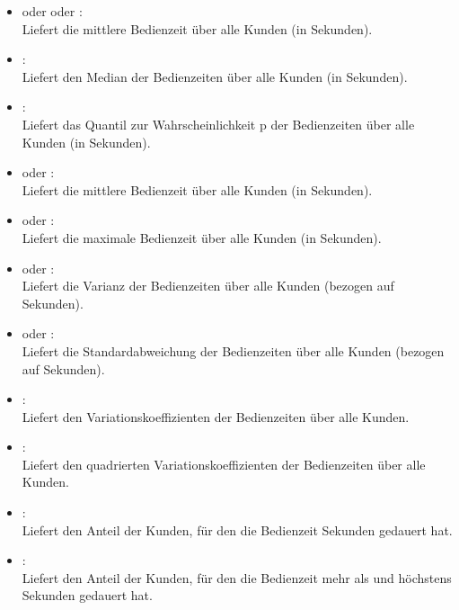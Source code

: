 \begin{itemize}

\item
{} oder  oder :\\
Liefert die mittlere Bedienzeit über alle Kunden (in Sekunden).

\item
{}:\\
Liefert den Median der Bedienzeiten über alle Kunden (in Sekunden).

\item
{}:\\
Liefert das Quantil zur Wahrscheinlichkeit p der Bedienzeiten über alle Kunden (in Sekunden).

\item
{} oder :\\
Liefert die mittlere Bedienzeit über alle Kunden (in Sekunden).

\item
{} oder :\\
Liefert die maximale Bedienzeit über alle Kunden (in Sekunden).

\item
{} oder :\\
Liefert die Varianz der Bedienzeiten über alle Kunden (bezogen auf Sekunden).

\item
{} oder :\\
Liefert die Standardabweichung der Bedienzeiten über alle Kunden (bezogen auf Sekunden).

\item
{}:\\
Liefert den Variationskoeffizienten der Bedienzeiten über alle Kunden.

\item
{}:\\
Liefert den quadrierten Variationskoeffizienten der Bedienzeiten über alle Kunden.

\item
{}:\\
Liefert den Anteil der Kunden, für den die Bedienzeit  Sekunden gedauert hat.

\item
{}:\\
Liefert den Anteil der Kunden, für den die Bedienzeit mehr als  und höchstens  Sekunden gedauert hat.

\end{itemize}



